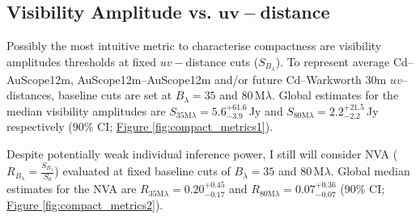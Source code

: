     \subsection{Visibility Amplitude vs. $\boldsymbol{uv-}$distance}
        Possibly the most intuitive metric to characterise compactness are visibility amplitudes thresholds at fixed $uv-$distance cuts ($S_{B_\lambda}$). To represent average Cd--AuScope12m, AuScope12m--AuScope12m and/or future Cd--Warkworth 30m \citep{Petrov2015} $uv$--distances, baseline cuts are set at $B_\lambda=35$ and $80$\,M$\lambda$. Global estimates for the median visibility amplitudes are $S_{35\text{M}\lambda}=5.6^{+61.6}_{-3.9}$\,Jy and $S_{80\text{M}\lambda}=2.2^{+21.5}_{-2.2}$\,Jy respectively (90\% CI; \hyperref[fig:compact_metrics1]{Figure \ref*{fig:compact_metrics1}}). 
        
        
        Despite potentially weak individual inference power, I still will consider NVA ($R_{B_\lambda}=\frac{S_{B_\lambda}}{S_0}$) evaluated at fixed baseline cuts of $B_\lambda=35$ and 80\,M$\lambda$. Global median estimates for the NVA are $R_{35\text{M}\lambda}=0.20^{+0.45}_{-0.17}$ and $R_{80\text{M}\lambda}=0.07^{+0.36}_{-0.07}$ (90\% CI; \hyperref[fig:compact_metrics2]{Figure \ref*{fig:compact_metrics2}}).
        
